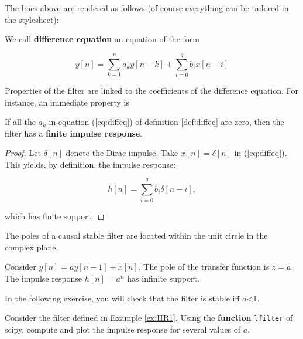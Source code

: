     The lines above are rendered as follows (of course everything can be
tailored in the stylesheet):

\begin{definition} \label{def:diffeq} We call
\textbf{difference equation} an equation of the form

\begin{equation}
\label{eq:diffeq}
y[n]= \sum_{k=1}^{p} a_k y[n-k] + \sum_{i=0}^q b_i x[n-i]
\end{equation}

\end{definition} Properties of the filter are linked to the
coefficients of the difference equation. For instance, an immediate
property is

\begin{property} If all the \(a_k\) in equation
(\ref{eq:diffeq}) of definition \ref{def:diffeq} are zero, then the
filter has a \textbf{finite impulse response}. \end{property}

\begin{proof} Let \(\delta[n]\) denote the Dirac impulse. Take
\(x[n]=\delta[n]\) in (\ref{eq:diffeq}). This yields, by definition, the
impulse response:

\begin{equation}
\label{eq:fir}
h[n]= \sum_{i=0}^q b_i \delta[n-i],
\end{equation}

which has finite support. \end{proof}

\begin{theorem} The poles of a causal stable filter are located
within the unit circle in the complex plane. \end{theorem}

\begin{example} \label{ex:IIR1} Consider
\(y[n]= a y[n-1] + x[n]\). The pole of the transfer function is \(z=a\).
The impulse response \(h[n]=a^n\) has infinite support.
\end{example}

In the following exercise, you will check that the filter is stable iff
\(a\)\textless{}1.

\begin{exercise}\label{ex:exofilter} Consider the filter
defined in Example \ref{ex:IIR1}. Using the \textbf{function}
\texttt{lfilter} of scipy, compute and plot the impulse response for
several values of \(a\). \end{exercise}

